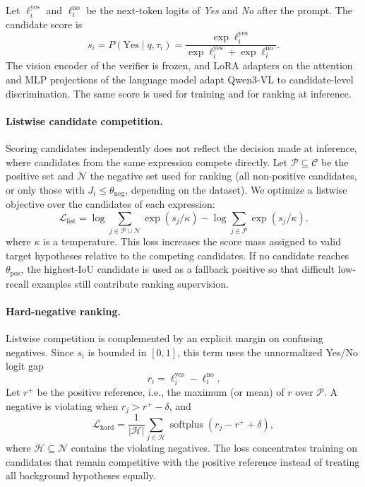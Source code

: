 Let $\ell_i^{\mathrm{yes}}$ and $\ell_i^{\mathrm{no}}$ be the next-token logits of \emph{Yes} and \emph{No} after the prompt. The candidate score is
\begin{equation}
 s_i
 =
 P(\mathrm{Yes}\mid q,\tau_i)
 =\frac{\exp\ell_i^{\mathrm{yes}}}{\exp\ell_i^{\mathrm{yes}}+\exp\ell_i^{\mathrm{no}}}.
\end{equation}
The vision encoder of the verifier is frozen, and LoRA adapters on the attention and MLP projections of the language model adapt Qwen3-VL to candidate-level discrimination. The same score is used for training and for ranking at inference.

\paragraph{Listwise candidate competition.}
Scoring candidates independently does not reflect the decision made at inference, where candidates from the same expression compete directly. Let $\mathcal{P}\subseteq\mathcal{C}$ be the positive set and $\mathcal{N}$ the negative set used for ranking (all non-positive candidates, or only those with $J_i\le\theta_{\mathrm{neg}}$, depending on the dataset). We optimize a listwise objective over the candidates of each expression:
\begin{equation}
\mathcal{L}_{\mathrm{list}}
=
\log\!\!\sum_{j\in\mathcal{P}\cup\mathcal{N}}\!\!\exp(s_j/\kappa)
-
\log\sum_{j\in\mathcal{P}}\exp(s_j/\kappa).
\end{equation}
where $\kappa$ is a temperature. This loss increases the score mass assigned to valid target hypotheses relative to the competing candidates. If no candidate reaches $\theta_{\mathrm{pos}}$, the highest-IoU candidate is used as a fallback positive so that difficult low-recall examples still contribute ranking supervision.

\paragraph{Hard-negative ranking.}
Listwise competition is complemented by an explicit margin on confusing negatives. Since $s_i$ is bounded in $[0,1]$, this term uses the unnormalized Yes/No logit gap
\begin{equation}
 r_i=\ell_i^{\mathrm{yes}}-\ell_i^{\mathrm{no}} .
\end{equation}
Let $r^{+}$ be the positive reference, i.e., the maximum (or mean) of $r$ over $\mathcal{P}$. A negative is violating when $r_j>r^{+}-\delta$, and
\begin{equation}
\mathcal{L}_{\mathrm{hard}}
=
\frac{1}{|\mathcal{H}|}
\sum_{j\in\mathcal{H}}
\operatorname{softplus}(r_j-r^{+}+\delta),
\end{equation}
where $\mathcal{H}\subseteq\mathcal{N}$ contains the violating negatives. The loss concentrates training on candidates that remain competitive with the positive reference instead of treating all background hypotheses equally.

